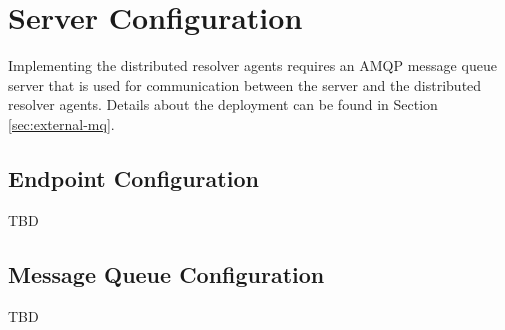 \section{Server Configuration}\label{sec:resolver-server}

Implementing the distributed resolver agents requires an AMQP message queue server that
is used for communication between the \cxoneflow server and the distributed resolver
agents.  Details about the deployment can be found in Section \ref{sec:external-mq}.

\subsection{\cxoneflow Endpoint Configuration}
TBD


\subsection{Message Queue Configuration}

TBD